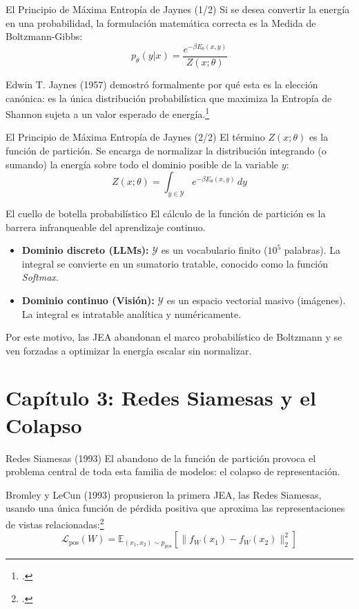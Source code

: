 \documentclass[aspectratio=169, 12pt]{beamer}
\begin{document}
\begin{frame}{El Principio de Máxima Entropía de Jaynes (1/2)}
Si se desea convertir la energía en una probabilidad, la formulación matemática correcta es la Medida de Boltzmann-Gibbs:
\[
    p_\theta(y | x) = \frac{e^{-\beta E_\theta(x, y)}}{Z(x; \theta)}
\]

Edwin T. Jaynes (1957) demostró formalmente por qué esta es la elección canónica: es la única distribución probabilística que maximiza la Entropía de Shannon sujeta a un valor esperado de energía.\footcite{jaynes1957information}
\end{frame}

\begin{frame}{El Principio de Máxima Entropía de Jaynes (2/2)}
El término $Z(x; \theta)$ es la función de partición. Se encarga de normalizar la distribución integrando (o sumando) la energía sobre todo el dominio posible de la variable $y$:
\[
    Z(x; \theta) = \int_{y \in \mathcal{Y}} e^{-\beta E_\theta(x, y)} \, dy
\]
\end{frame}

\begin{frame}{El cuello de botella probabilístico}
El cálculo de la función de partición es la barrera infranqueable del aprendizaje continuo.

\begin{itemize}
    \item \textbf{Dominio discreto (LLMs):} $\mathcal{Y}$ es un vocabulario finito ($10^5$ palabras). La integral se convierte en un sumatorio tratable, conocido como la función \textit{Softmax}.
    \item \textbf{Dominio continuo (Visión):} $\mathcal{Y}$ es un espacio vectorial masivo (imágenes). La integral es intratable analítica y numéricamente.
\end{itemize}
\vspace{0.5cm}
Por este motivo, las JEA abandonan el marco probabilístico de Boltzmann y se ven forzadas a optimizar la energía escalar sin normalizar.
\end{frame}

\section{Capítulo 3: Redes Siamesas y el Colapso}

\begin{frame}{Redes Siamesas (1993)}
El abandono de la función de partición provoca el problema central de toda esta familia de modelos: el colapso de representación.

Bromley y LeCun (1993) propusieron la primera JEA, las Redes Siamesas, usando una única función de pérdida positiva que aproxima las representaciones de vistas relacionadas:\footcite{bromley1993signature}
\[
    \mathcal{L}_{\text{pos}}(W) = \mathbb{E}_{(x_1, x_2) \sim p_{\text{pos}}} \left[ \| f_W(x_1) - f_W(x_2) \|_2^2 \right]
\]
\end{frame}
\end{document}
